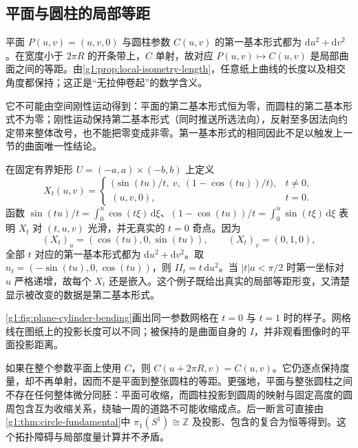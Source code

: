 \subsection{平面与圆柱的局部等距}
\label{g1:subsec:0805:02}

平面 \(P(u,v)=(u,v,0)\) 与圆柱参数 \(C(u,v)\) 的第一基本形式都为 \(\mathrm{d}u^2+\mathrm{d}v^2\)。在宽度小于 \(2\pi R\) 的开条带上，\(C\) 单射，故对应 \(P(u,v)\mapsto C(u,v)\) 是局部曲面之间的等距。由\cref{g1:prop:local-isometry-length}，任意纸上曲线的长度以及相交角度都保持；这正是“无拉伸卷起”的数学含义。

\ProseParagraphBreak

它不可能由空间刚性运动得到：平面的第二基本形式恒为零，而圆柱的第二基本形式不为零；刚性运动保持第二基本形式（同时推送所选法向），反射至多因法向约定带来整体改号，也不能把零变成非零。第一基本形式的相同因此不足以触发上一节的曲面唯一性结论。

\begin{example}\label{g1:exm:plane-cylinder-bending}
	在固定有界矩形 \(U=(-a,a)\times(-b,b)\) 上定义
	\[
		X_t(u,v)=
		\begin{cases}
			\bigl(\sin(tu)/t,\ v,\ (1-\cos(tu))/t\bigr),&t\ne0,\\
			(u,v,0),&t=0.
		\end{cases}
	\]
	函数 \(\sin(tu)/t=\int_0^u\cos(t\xi)\,\mathrm{d}\xi\)、\((1-\cos(tu))/t=\int_0^u\sin(t\xi)\,\mathrm{d}\xi\) 表明 \(X_t\) 对 \((t,u,v)\) 光滑，并无真实的 \(t=0\) 奇点。因为
	\[
		(X_t)_u=(\cos(tu),0,\sin(tu)),\qquad (X_t)_v=(0,1,0),
	\]
	全部 \(t\) 对应的第一基本形式都为 \(\mathrm{d}u^2+\mathrm{d}v^2\)。取 \(n_t=(-\sin(tu),0,\cos(tu))\)，则 \(II_t=t\,\mathrm{d}u^2\)。当 \(|t|a<\pi/2\) 时第一坐标对 \(u\) 严格递增，故每个 \(X_t\) 还是嵌入。这个例子既给出真实的局部等距形变，又清楚显示被改变的数据是第二基本形式。
\end{example}

\cref{g1:fig:plane-cylinder-bending}画出同一参数网格在 \(t=0\) 与 \(t=1\) 时的样子。网格线在图纸上的投影长度可以不同；被保持的是曲面自身的 \(I\)，并非观看图像时的平面投影距离。



如果在整个参数平面上使用 \(C\)，则 \(C(u+2\pi R,v)=C(u,v)\)。它仍逐点保持度量，却不再单射，因而不是平面到整张圆柱的等距。更强地，平面与整张圆柱之间不存在任何整体微分同胚：平面可收缩，而圆柱投影到圆周的映射与固定高度的圆周包含互为收缩关系，绕轴一周的道路不可能收缩成点。后一断言可直接由\cref{g1:thm:circle-fundamental}中 \(\pi_1(S^1)\cong\mathbb Z\) 及投影、包含的复合为恒等得到。这个拓扑障碍与局部度量计算并不矛盾。


